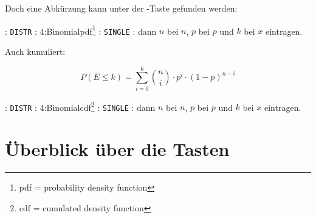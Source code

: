 Doch eine Abkürzung kann unter der -Taste gefunden werden:

: \texttt{DISTR} :
4:Binomialpdf\footnote{pdf = probability density function} :
\texttt{SINGLE} : dann $n$ bei $n$, $p$ bei $p$ und $k$ bei $x$ eintragen.

Auch kumuliert:

 $$P(E \le k) = \sum_{i=0}^{k}{n \choose i}\cdot{}p^i\cdot{}(1-p)^{n-i}$$

: \texttt{DISTR} :
4:Binomialcdf\footnote{cdf = cumulated density function} :
\texttt{SINGLE} : dann $n$ bei $n$, $p$ bei $p$ und $k$ bei $x$ eintragen.

     


\newpage


\section*{Überblick über die Tasten}

